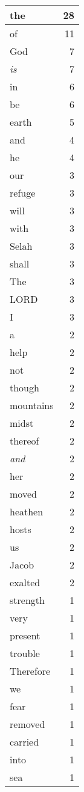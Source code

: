\begin{center}
\begin{longtable}{l|r}
\hline \hline
\endlastfoot
the & 28 \\ \hline
of & 11 \\ \hline
God & 7 \\ \hline
\emph{is} & 7 \\ \hline
in & 6 \\ \hline
be & 6 \\ \hline
earth & 5 \\ \hline
and & 4 \\ \hline
he & 4 \\ \hline
our & 3 \\ \hline
refuge & 3 \\ \hline
will & 3 \\ \hline
with & 3 \\ \hline
Selah & 3 \\ \hline
shall & 3 \\ \hline
The & 3 \\ \hline
LORD & 3 \\ \hline
I & 3 \\ \hline
a & 2 \\ \hline
help & 2 \\ \hline
not & 2 \\ \hline
though & 2 \\ \hline
mountains & 2 \\ \hline
midst & 2 \\ \hline
thereof & 2 \\ \hline
\emph{and} & 2 \\ \hline
her & 2 \\ \hline
moved & 2 \\ \hline
heathen & 2 \\ \hline
hosts & 2 \\ \hline
us & 2 \\ \hline
Jacob & 2 \\ \hline
exalted & 2 \\ \hline
strength & 1 \\ \hline
very & 1 \\ \hline
present & 1 \\ \hline
trouble & 1 \\ \hline
Therefore & 1 \\ \hline
we & 1 \\ \hline
fear & 1 \\ \hline
removed & 1 \\ \hline
carried & 1 \\ \hline
into & 1 \\ \hline
sea & 1 \\ \hline

\end{longtable}
\end{center}
